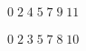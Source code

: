 \documentclass[varwidth, margin=5mm]{standalone}
\begin{document}
$0 \; 2 \; 4 \; 5 \; 7 \; 9 \; 11 $ \\ 
\\
$0 \; 2 \; 3 \; 5 \; 7 \; 8 \; 10$
\end{document}
